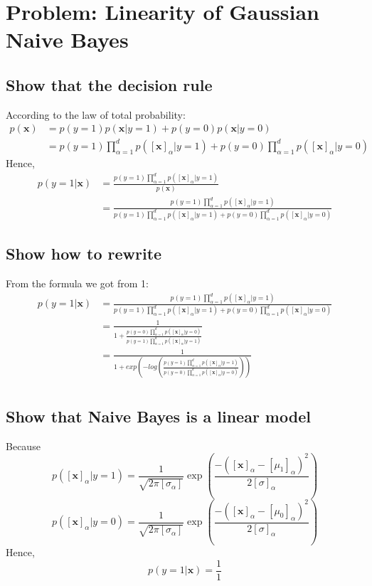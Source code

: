 \documentclass{article}
\begin{document}
	\section{Problem: Linearity of Gaussian Naive Bayes}
	\subsection{Show that the decision rule}
	According to the law of total probability:
	\[
		\begin{split}
			p(\textbf{x}) &= p(y=1)p(\textbf{x}|y=1)+p(y=0)p(\textbf{x}|y=0)\\
			&=p(y=1)\prod_{\alpha=1}^d {p([\textbf{x}]_{\alpha}|y=1)} +p(y=0)\prod_{\alpha=1}^d {p([\textbf{x}]_{\alpha}|y=0)}
		\end{split}
	\]
	Hence,
	\[
		\begin{split}
			p(y=1|\textbf{x}) &=\frac{
				p(y=1) 
				\prod_{\alpha=1}^d {
					p([\textbf{x}]_{\alpha}|y=1)
				} 
			}{
				p(\textbf{x})
			} \\
			&=\frac{
				p(y=1)\prod_{\alpha=1}^d {
					p([\textbf{x}]_{\alpha}|y=1)
				}
			}{
				p(y=1)\prod_{\alpha=1}^d {
					p([\textbf{x}]_{\alpha}|y=1)
				}
				+p(y=0)\prod_{\alpha=1}^d {
					p([\textbf{x}]_{\alpha}|y=0)
				}
			}
		\end{split}
	\]
	
	\subsection{Show how to rewrite}
	From the formula we got from 1:
	\[
		\begin{split}
			p(y=1|\textbf{x}) 
			&=\frac{
				p(y=1)\prod_{\alpha=1}^d {
					p([\textbf{x}]_{\alpha}|y=1)
				}
			}{
				p(y=1)\prod_{\alpha=1}^d {
					p([\textbf{x}]_{\alpha}|y=1)
				}
				+p(y=0)\prod_{\alpha=1}^d {
					p([\textbf{x}]_{\alpha}|y=0)
				}
			}\\
			&=\frac{1}{
				1 + \frac{
					p(y=0)\prod_{\alpha=1}^d {
						p([\textbf{x}]_{\alpha}|y=0)
					}
				}{
					p(y=1)\prod_{\alpha=1}^d {
						p([\textbf{x}]_{\alpha}|y=1)
					}
				}
			}\\
			&=\frac{1}{
				1 + exp(
					-log(
						\frac{
							p(y=1)\prod_{\alpha=1}^d {
								p([\textbf{x}]_{\alpha}|y=1)
							}
						}{
							p(y=0)\prod_{\alpha=1}^d {
								p([\textbf{x}]_{\alpha}|y=0)
							}
						}
					)
				)
			}\\
		\end{split}
	\]
	\subsection{Show that Naive Bayes is a linear model}
	Because
	\[
		p([\textbf{x}]_{\alpha}|y=1)=
		\frac{1}{\sqrt{2\pi[\sigma_{\alpha}]}}
		\exp\left({
			\frac{
			-([\textbf{x}]_{\alpha}-[\mu_1]_{\alpha})^2
			}{
				2[\sigma]_{\alpha}
			}
		}\right)
	\]
	\[
		p([\textbf{x}]_{\alpha}|y=0)=
		\frac{1}{\sqrt{2\pi[\sigma_{\alpha}]}}
		\exp\left({
			\frac{
			-([\textbf{x}]_{\alpha}-[\mu_0]_{\alpha})^2
			}{
				2[\sigma]_{\alpha}
			}
		}\right)
	\]
	Hence,
	\[
		p(y=1|\textbf{x})=\frac{1}{1}
	\]
\end{document}
